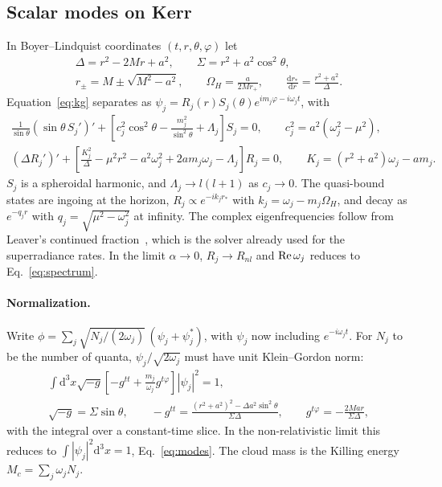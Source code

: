 \documentclass[11pt]{article}
\newcommand{\dd}{\mathrm{d}}
\begin{document}
\subsection{Scalar modes on Kerr}

In Boyer--Lindquist coordinates $(t,r,\theta,\varphi)$ let
\begin{gather}
\Delta=r^2-2Mr+a^2,\qquad\Sigma=r^2+a^2\cos^2\theta,\nonumber\\
r_\pm=M\pm\sqrt{M^2-a^2},\qquad\Omega_H=\frac{a}{2Mr_+},\qquad\frac{\dd r_*}{\dd r}=\frac{r^2+a^2}{\Delta}.
\end{gather}
Equation~\eqref{eq:kg} separates as $\psi_j=R_j(r)S_j(\theta)e^{im_j\varphi-i\omega_jt}$, with
\begin{gather}
\frac{1}{\sin\theta}\left(\sin\theta\,S_j'\right)'+\left[c_j^2\cos^2\theta-\frac{m_j^2}{\sin^2\theta}+\Lambda_j\right]S_j=0,\qquad c_j^2=a^2(\omega_j^2-\mu^2),\nonumber\\
\left(\Delta R_j'\right)'+\left[\frac{K_j^2}{\Delta}-\mu^2r^2-a^2\omega_j^2+2am_j\omega_j-\Lambda_j\right]R_j=0,\qquad K_j=(r^2+a^2)\omega_j-am_j .
\label{eq:kerr_scalar}
\end{gather}
$S_j$ is a spheroidal harmonic, and $\Lambda_j\to l(l+1)$ as $c_j\to0$. The quasi-bound states are ingoing at the horizon, $R_j\propto e^{-ik_jr_*}$ with $k_j=\omega_j-m_j\Omega_H$, and decay as $e^{-q_jr}$ with $q_j=\sqrt{\mu^2-\omega_j^2}$ at infinity. The complex eigenfrequencies follow from Leaver's continued fraction~\cite{Leaver85,Dolan07}, which is the solver already used for the superradiance rates. In the limit $\alpha\to0$, $R_j\to R_{nl}$ and ${\rm Re}\,\omega_j$ reduces to Eq.~\eqref{eq:spectrum}.

\paragraph{Normalization.} Write $\phi=\sum_j\sqrt{N_j/(2\omega_j)}\,(\psi_j+\psi_j^*)$, with $\psi_j$ now including $e^{-i\omega_jt}$. For $N_j$ to be the number of quanta, $\psi_j/\sqrt{2\omega_j}$ must have unit Klein--Gordon norm:
\begin{gather}
\int\dd^3x\sqrt{-g}\left[-g^{tt}+\frac{m_j}{\omega_j}g^{t\varphi}\right]|\psi_j|^2=1,\label{eq:kgnorm}\\
\sqrt{-g}=\Sigma\sin\theta,\qquad -g^{tt}=\frac{(r^2+a^2)^2-\Delta a^2\sin^2\theta}{\Sigma\Delta},\qquad g^{t\varphi}=-\frac{2Mar}{\Sigma\Delta},\nonumber
\end{gather}
with the integral over a constant-time slice. In the non-relativistic limit this reduces to $\int|\psi_j|^2\dd^3x=1$, Eq.~\eqref{eq:modes}. The cloud mass is the Killing energy $M_c=\sum_j\omega_jN_j$.
\end{document}
